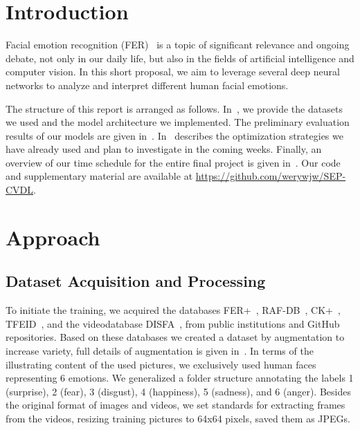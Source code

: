 \section{Introduction}
\label{sec:intro}

Facial emotion recognition (FER)~\cite{Ko18} is a topic of significant relevance and ongoing debate, not only in our daily life, but also in the fields of artificial intelligence and computer vision.
In this short proposal, we aim to leverage several deep neural networks to analyze and interpret different human facial emotions. 

The structure of this report is arranged as follows. 
In~, 
we provide the datasets we used and the model architecture we implemented. 
The preliminary evaluation results of our models are given in~. 
In~ describes the optimization strategies we have already used and plan to investigate in the coming weeks. 
Finally,
an overview of our time schedule for the entire final project is given in~. 
Our code and supplementary material are available at \url{https://github.com/werywjw/SEP-CVDL}.


\section{Approach}
\label{sec:approach}

\subsection{Dataset Acquisition and Processing}
\label{sec:datasets}
To initiate the training, 
we acquired the databases FER+~\cite{BarsoumZCZ16}, RAF-DB~\cite{li2019reliable}, CK+~\cite{LuceyCKSAM10}, TFEID~\cite{tfeid}, and the videodatabase DISFA~\cite{MavadatiMBTC13}, from public institutions and GitHub repositories.
Based on these databases we created a dataset by augmentation to increase variety, 
full details of augmentation is given in~. 
In terms of the illustrating content of the used pictures, we exclusively used human faces representing 6 emotions. We generalized a folder structure annotating the labels 1 (surprise), 2 (fear), 3 (disgust), 4 (happiness), 5 (sadness), and 6 (anger). 
Besides the original format of images and videos, we set standards for extracting frames from the videos, resizing training pictures to 64x64 pixels, saved them as JPEGs.

